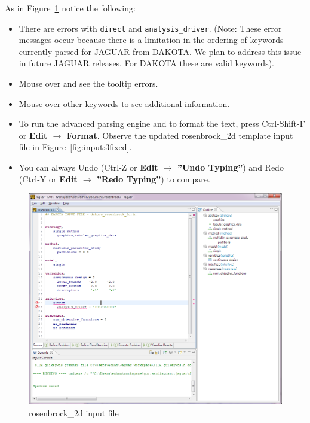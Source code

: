 As in Figure~\ref{fig:input:2rosenbrockfile} notice the following:
\begin{itemize}      
\item There are errors with \texttt{direct} and \texttt{analysis\_driver}. (Note: These error messages occur because there is a limitation in the ordering of keywords currently parsed for JAGUAR from DAKOTA. We plan to address this issue in future JAGUAR releases. For DAKOTA these are valid keywords). 
\item Mouse over and see the tooltip errors.
\item Mouse over other keywords to see additional information.
\item To run the advanced parsing engine and to format the text, press Ctrl-Shift-F or {\bf Edit $\rightarrow$ Format}. Observe the updated rosenbrock\_2d template input file in Figure~\ref{fig:input:3fixed}. 
\item You can always Undo (Ctrl-Z or {\bf Edit $\rightarrow$ ''Undo Typing''}) and Redo (Ctrl-Y or {\bf Edit $\rightarrow$ ''Redo Typing''}) to compare.
\end{itemize}
\begin{figure}[htbp]
  \centering
  \includegraphics[scale=0.6]{images/2rosenbrockfile}
  \caption{rosenbrock\_2d input file}
  \label{fig:input:2rosenbrockfile}
\end{figure}

